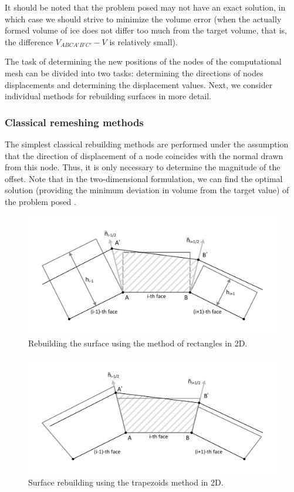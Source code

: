 It should be noted that the problem posed may not have an exact solution, in which case we should strive to minimize the volume error (when the actually formed volume of ice does not differ too much from the target volume, that is, the difference $V_{ABCA'B'C'} - V$ is relatively small).

The task of determining the new positions of the nodes of the computational mesh can be divided into two tasks: determining the directions of nodes displacements and determining the displacement values.
Next, we consider individual methods for rebuilding surfaces in more detail.

\subsubsection{Classical remeshing methods}

The simplest classical rebuilding methods are performed under the assumption that the direction of displacement of a node coincides with the normal drawn from this node.
Thus, it is only necessary to determine the magnitude of the offset.
Note that in the two-dimensional formulation, we can find the optimal solution (providing the minimum deviation in volume from the target value) of the problem posed \cite{Rybakov_2D}.

\begin{figure}[ht]
\centering
\includegraphics[width=\textwidth]{pics/text_1_remesh_3d/pic_classical_methods_rectangles.pdf}
\caption{Rebuilding the surface using the method of rectangles in 2D.}\label{fig:pic_classical_methods_rectangles}
\end{figure}

\begin{figure}[ht]
\centering
\includegraphics[width=\textwidth]{pics/text_1_remesh_3d/pic_classical_methods_trapezoids.pdf}
\caption{Surface rebuilding using the trapezoids method in 2D.}\label{fig:pic_classical_methods_trapezoids}
\end{figure}


